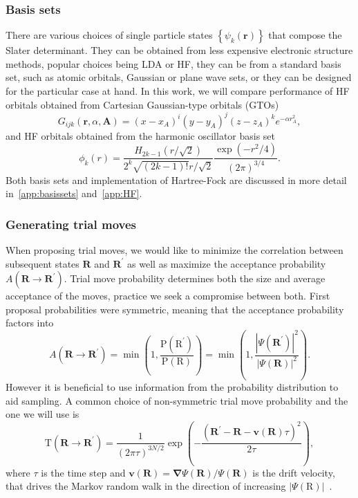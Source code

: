 \documentclass[final,3p,times,twocolumn]{elsarticle}
\begin{document}
	\subsubsection{Basis sets}
	There are various choices of single particle states $\left\{\psi_k(\mathbf{r})\right\}$ that compose the Slater determinant. They can be obtained from less expensive electronic structure methods, popular choices being LDA or HF, they can be from a standard basis set, such as atomic orbitals, Gaussian or plane wave sets, or they can be designed for the particular case at hand. In this work, we will compare performance of HF orbitals obtained from Cartesian Gaussian-type orbitals (GTOs)
	\begin{equation}
	G_{i j k}(\mathbf{r}, \alpha, \mathbf{A})=(x-x_{A})^{i} (y-y_{A})^{j} (z-z_{A})^{k} e^{-\alpha r_{A}^{2}},
	\end{equation}
	and HF orbitals obtained from the harmonic oscillator basis set
	\begin{equation}
		\phi_{k}(r)=\frac{H_{2 k-1}(r / \sqrt{2})}{2^{k} \sqrt{(2 k-1) !} r / \sqrt{2}} \frac{\exp \left(-r^{2} / 4\right)}{(2 \pi)^{3 / 4}}.
	\end{equation}
	Both basis sets and implementation of Hartree-Fock are discussed in more detail in~\ref{app:basissets} and~\ref{app:HF}.  
	
	\subsubsection{Generating trial moves}
	When proposing trial moves, we would like to minimize the correlation between subsequent states $\mathbf{R}$ and $\mathbf{R}^\prime$ as well as maximize the acceptance probability $A(\mathbf{R} \rightarrow \mathbf{R}^{\prime})$. Trial move probability determines both the size and average acceptance of the moves, practice we seek a compromise between both. First proposal probabilities were symmetric, meaning that the acceptance probability factors into
	\begin{equation}
		A\left(\mathbf{R} \rightarrow \mathbf{R}^{\prime}\right)=\min \left(1, \frac{\mathrm{P}(\mathrm{R}^{\prime})}{\mathrm{P}(\mathrm{R})}\right) = \min\left(1, \frac{|\Psi(\mathbf{R}^\prime)|^2}{|\Psi(\mathbf{R})|^2}\right).
	\end{equation}
	However it is beneficial to use information from the probability distribution to aid sampling. A common choice of non-symmetric trial move probability and the one we will use is 
	\begin{equation}
		\mathrm{T}\left(\mathbf{R} \rightarrow \mathbf{R}^{\prime}\right) = \frac{1}{(2 \pi \tau)^{3 N / 2}}\exp\left({-} \frac{\left(\mathbf{R}^{\prime}-\mathbf{R}-\mathbf{v}\left(\mathbf{R}\right) \tau\right)^{2}}{2 \tau}\right),
	\end{equation}
	where $\tau$ is the time step and $\mathbf{v}(\mathbf{R})=\boldsymbol{\nabla} \Psi(\mathbf{R}) / \Psi(\mathbf{R})$ is the drift velocity, that drives the Markov random walk in the direction of increasing $|\Psi(\mathrm{R})|$~\cite{gubernatis_kawashima_werner_2016}.
	
\end{document}
